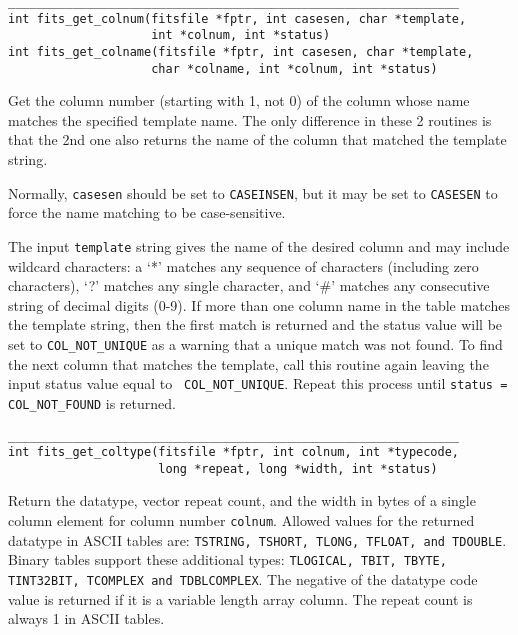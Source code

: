 \documentclass[11pt]{article}
\begin{document}
\begin{verbatim}
_______________________________________________________________
int fits_get_colnum(fitsfile *fptr, int casesen, char *template,
                    int *colnum, int *status)
int fits_get_colname(fitsfile *fptr, int casesen, char *template,
                    char *colname, int *colnum, int *status)
\end{verbatim}

Get the  column number (starting with 1, not 0) of the column whose
name matches the specified template name.  The only difference in
these 2 routines is that the 2nd one also returns the name of the
column that matched the template string.

Normally, {\tt casesen} should
be set to {\tt CASEINSEN}, but it may be set to {\tt CASESEN} to force
the name matching to be case-sensitive.

The input {\tt template} string gives the name of the desired column and
may include wildcard characters:  a `*' matches any sequence of
characters (including zero characters), `?' matches any single
character, and `\#' matches any consecutive string of decimal digits
(0-9).  If more than one column name in the table matches the template
string, then the first match is returned and the status value will be
set to {\tt COL\_NOT\_UNIQUE}  as a warning that a unique match was not
found.  To find the next column that matches the template, call this
routine again leaving the input status value equal to {\tt
COL\_NOT\_UNIQUE}.  Repeat this process until {\tt status =
COL\_NOT\_FOUND}  is returned.

\begin{verbatim}
_______________________________________________________________
int fits_get_coltype(fitsfile *fptr, int colnum, int *typecode,
                     long *repeat, long *width, int *status)
\end{verbatim}

Return the datatype, vector repeat count, and the width in bytes of a
single column element for column number {\tt colnum}.  Allowed values
for the returned datatype in ASCII tables are:  {\tt TSTRING, TSHORT,
TLONG, TFLOAT, and TDOUBLE}.  Binary tables support these additional
types: {\tt TLOGICAL, TBIT, TBYTE, TINT32BIT, TCOMPLEX and TDBLCOMPLEX}.  The
negative of the datatype code value is returned if it is a variable
length array column.  The repeat count is always 1 in ASCII tables.
\end{document}
